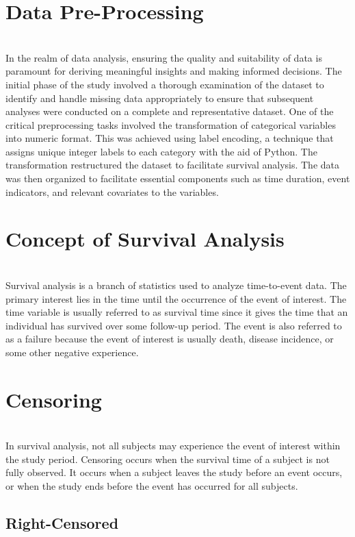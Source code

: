 \documentclass[doublespacing]{report} %
\begin{document}
\section{Data Pre-Processing}
\\
In the realm of data analysis, ensuring the quality and suitability of data is paramount for deriving meaningful insights and making informed decisions. The initial phase of the study involved a thorough examination of the dataset to identify and handle missing data appropriately to ensure that subsequent analyses were conducted on a complete and representative dataset. One of the critical preprocessing tasks involved the transformation of categorical variables into numeric format. This was achieved using label encoding, a technique that assigns unique integer labels to each category with the aid of Python. The transformation restructured the dataset to facilitate survival analysis. The data was then organized to facilitate essential components such as time duration, event indicators, and relevant covariates to the variables. 

\section{Concept of Survival Analysis}

\\Survival analysis is a branch of statistics used to analyze time-to-event data. The primary interest lies in the time until the occurrence of the event of interest.  The time variable is usually referred to as survival time since it gives the time that an individual has survived over some follow-up period. The event is also referred to as a failure because the event of interest is usually death, disease incidence, or some other negative experience. 

\section{Censoring}

\\In survival analysis, not all subjects may experience the event of interest within the study period. Censoring occurs when the survival time of a subject is not fully observed. It occurs when a subject leaves the study before an event occurs, or when the study ends before the event has occurred for all subjects.


\subsection{Right-Censored}
\end{document}
